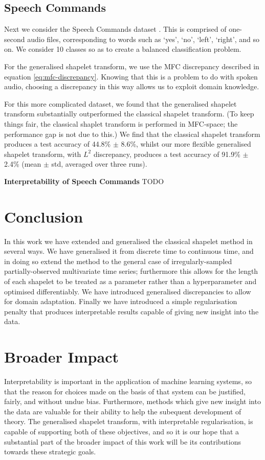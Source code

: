 \documentclass{article}
\theoremstyle{plain}
\theoremstyle{definition}
\newcommand{\boldheading}[1]{

\textbf{#1}\quad}
\begin{document}
\subsection{Speech Commands}
Next we consider the Speech Commands dataset \cite{warden2018speech}. This is comprised of one-second audio files, corresponding to words such as `yes', `no', `left', `right', and so on. We consider 10 classes so as to create a balanced classification problem.

For the generalised shapelet transform, we use the MFC discrepancy described in equation \eqref{eq:mfc-discrepancy}. Knowing that this is a problem to do with spoken audio, choosing a discrepancy in this way allows us to exploit domain knowledge.

For this more complicated dataset, we found that the generalised shapelet transform substantially outperformed the classical shapelet transform. (To keep things fair, the classical shaplet transform is performed in MFC-space; the performance gap is not due to this.) We find that  the classical shapelet transform produces a test accuracy of 44.8\% $\pm$ 8.6\%, whilst our more flexible generalised shapelet transform, with $L^2$ discrepancy, produces a test accuracy of 91.9\% $\pm$ 2.4\% (mean $\pm$ std, averaged over three runs).

\boldheading{Interpretability of Speech Commands}
TODO



	\section{Conclusion}
	In this work we have extended and generalised the classical shapelet method in several ways. We have generalised it from discrete time to continuous time, and in doing so extend the method to the general case of irregularly-sampled partially-observed multivariate time series; furthermore this allows for the length of each shapelet to be treated as a parameter rather than a hyperparameter and optimised differentiably. We have introduced generalised discrepancies to allow for domain adaptation. Finally we have introduced a simple regularisation penalty that produces interpretable results capable of giving new insight into the data.
	
	\section*{Broader Impact}
	Interpretability is important in the application of machine learning systems, so that the reason for choices made on the basis of that system can be justified, fairly, and without undue bias. Furthermore, methods which give new insight into the data are valuable for their ability to help the subequent development of theory. The generalised shapelet transform, with interpretable regularisation, is capable of supporting both of these objectives, and so it is our hope that a substantial part of the broader impact of this work will be its contributions towards these strategic goals.
	
\end{document}
